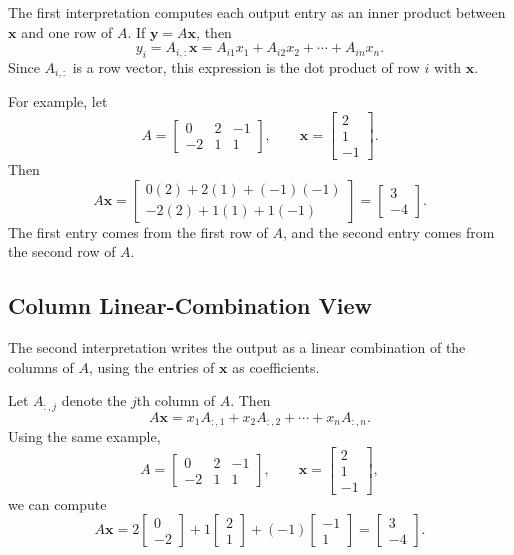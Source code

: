 The first interpretation computes each output entry as an inner product between \(\mathbf{x}\) and one row of \(A\). If \(\mathbf{y}=A\mathbf{x}\), then
\[
    y_i = A_{i,:}\mathbf{x}
    = A_{i1}x_1+A_{i2}x_2+\cdots+A_{in}x_n.
\]
Since \(A_{i,:}\) is a row vector, this expression is the dot product of row \(i\) with \(\mathbf{x}\).

For example, let
\[
    A=
    \begin{bmatrix}
        0 & 2 & -1\\
        -2 & 1 & 1
    \end{bmatrix},
    \qquad
    \mathbf{x}=\begin{bmatrix}2\\1\\-1\end{bmatrix}.
\]
Then
\[
    A\mathbf{x}
    =
    \begin{bmatrix}
        0(2)+2(1)+(-1)(-1)\\
        -2(2)+1(1)+1(-1)
    \end{bmatrix}
    =
    \begin{bmatrix}3\\-4\end{bmatrix}.
\]
The first entry comes from the first row of \(A\), and the second entry comes from the second row of \(A\).

\subsection{Column Linear-Combination View}
\label{mf:matrix-vector-column-view}

The second interpretation writes the output as a linear combination of the columns of \(A\), using the entries of \(\mathbf{x}\) as coefficients.

Let \(A_{:,j}\) denote the \(j\)th column of \(A\). Then
\[
    A\mathbf{x}
    =x_1A_{:,1}+x_2A_{:,2}+\cdots+x_nA_{:,n}.
\]
Using the same example,
\[
    A=
    \begin{bmatrix}
        0 & 2 & -1\\
        -2 & 1 & 1
    \end{bmatrix},
    \qquad
    \mathbf{x}=\begin{bmatrix}2\\1\\-1\end{bmatrix},
\]
we can compute
\[
    A\mathbf{x}
    =
    2\begin{bmatrix}0\\-2\end{bmatrix}
    +1\begin{bmatrix}2\\1\end{bmatrix}
    +(-1)\begin{bmatrix}-1\\1\end{bmatrix}
    =
    \begin{bmatrix}3\\-4\end{bmatrix}.
\]

